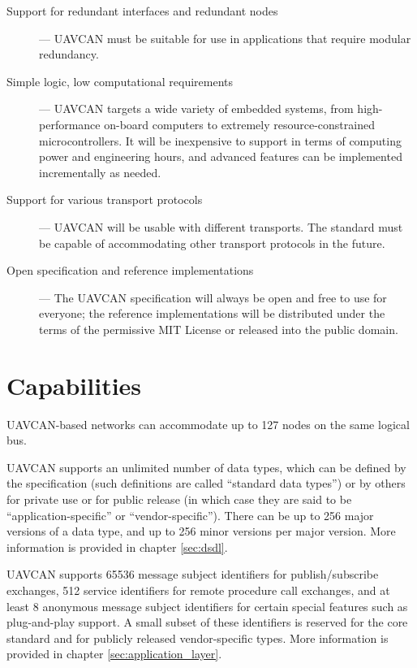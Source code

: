 \begin{description}
    \item[Support for redundant interfaces and redundant nodes] --- UAVCAN must be suitable for use in
    applications that require modular redundancy.

    \item[Simple logic, low computational requirements] --- UAVCAN targets a wide variety of embedded systems,
    from high-performance on-board computers to extremely resource-constrained microcontrollers.
    It will be inexpensive to support in terms of computing power and engineering hours,
    and advanced features can be implemented incrementally as needed.

    \item[Support for various transport protocols] --- UAVCAN will be usable with different transports.
    The standard must be capable of accommodating other transport protocols in the future.

    \item[Open specification and reference implementations] --- The UAVCAN specification will always be open and
    free to use for everyone; the reference implementations will be distributed under the terms of
    the permissive MIT License or released into the public domain.
\end{description}

\section{Capabilities}

UAVCAN-based networks can accommodate up to 127 nodes on the same logical bus.

UAVCAN supports an unlimited number of data types, which can be defined by the specification (such definitions
are called ``standard data types'') or by others for private use or for public release
(in which case they are said to be ``application-specific'' or ``vendor-specific'').
There can be up to 256 major versions of a data type, and up to 256 minor versions per major version.
More information is provided in chapter \ref{sec:dsdl}.

UAVCAN supports 65536 message subject identifiers for publish/subscribe exchanges,
512 service identifiers for remote procedure call exchanges,
and at least 8 anonymous message subject identifiers for certain special features such as plug-and-play support.
A small subset of these identifiers is reserved for the core standard and for publicly released vendor-specific types.
More information is provided in chapter \ref{sec:application_layer}.


